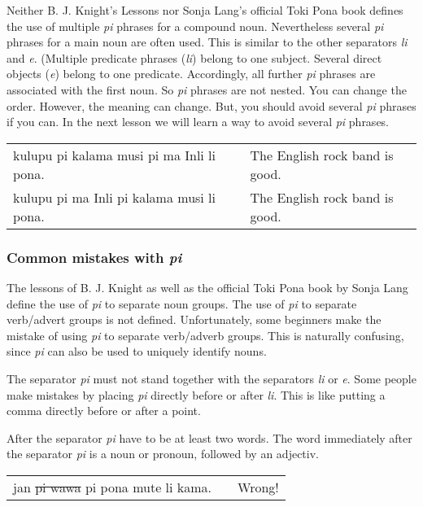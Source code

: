 Neither B. J. Knight's Lessons nor Sonja Lang's official Toki Pona book defines the use of multiple \textit{pi} phrases for a compound noun.
Nevertheless several \textit{pi} phrases for a main noun are often used.
This is similar to the other separators \textit{li} and \textit{e}.
(Multiple predicate phrases (\textit{li}) belong to one subject.
Several direct objects (\textit{e}) belong to one predicate.
Accordingly, all further \textit{pi} phrases are associated with the first noun.
So \textit{pi} phrases are not nested.
You can change the order.
However, the meaning can change.
But, you should avoid several \textit{pi} phrases if you can.
In the next lesson we will learn a way to avoid several \textit{pi} phrases.

\begin{supertabular}{p{5,5cm}|ll}
    kulupu pi kalama musi pi ma Inli li pona. &  & The English rock band is good. \\
    kulupu pi ma Inli pi kalama musi li pona. &  & The English rock band is good. \\
\end{supertabular}

\subsubsection*{Common mistakes with \textit{pi}}
\label{'mistakes_with_pi'}
The lessons of B. J. Knight as well as the official Toki Pona book by Sonja Lang define the use of \textit{pi} to separate noun groups.
The use of \textit{pi} to separate verb/advert groups is not defined.
Unfortunately, some beginners make the mistake of using \textit{pi} to separate verb/adverb groups.
This is naturally confusing, since \textit{pi}  can also be used to uniquely identify nouns.

The separator \textit{pi} must not stand together with the separators \textit{li} or \textit{e}.
Some people make mistakes by placing \textit{pi} directly before or after \textit{li}.
This is like putting a comma directly before or after a point.

After the separator \textit{pi} have to be at least two words.
The word immediately after the separator \textit{pi} is a noun or pronoun, followed by an adjectiv.

\begin{supertabular}{p{5,5cm}|ll}
    jan \sout{pi wawa} pi pona mute li kama. &  & Wrong! \\
\end{supertabular}

